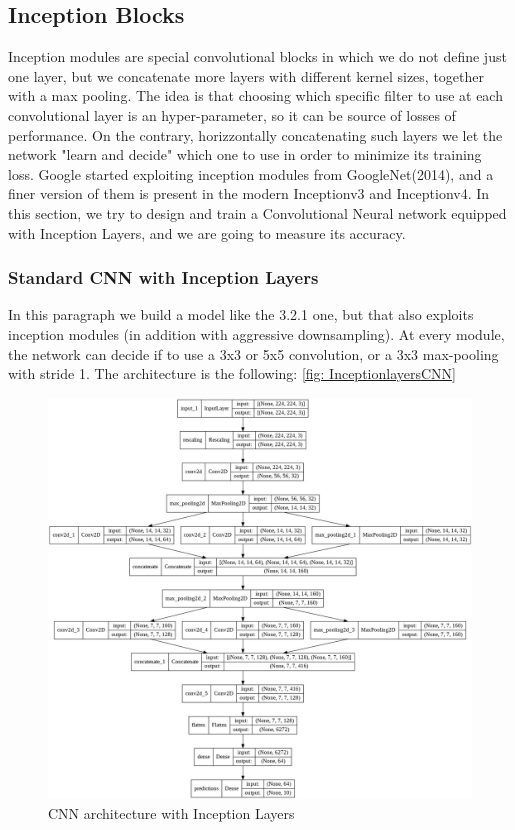 \subsection{Inception Blocks}
Inception modules are special convolutional blocks in which we do not define just one layer, but we concatenate more layers with different kernel sizes, together with a max pooling. The idea is that choosing which specific filter to use at each convolutional layer is an hyper-parameter, so it can be source of losses of performance. On the contrary, horizzontally concatenating such layers we let the network "learn and decide" which one to use in order to minimize its training loss. Google started exploiting inception modules from GoogleNet(2014), and a finer version of them is present in the modern Inceptionv3 and Inceptionv4. In this section, we try to design and train a Convolutional Neural network equipped with Inception Layers, and we are going to measure its accuracy. 

\subsubsection{Standard CNN with Inception Layers}
In this paragraph we build a model like the 3.2.1 one, but that also exploits inception modules (in addition with aggressive downsampling). At every module, the network can decide if to use a 3x3 or 5x5 convolution, or a 3x3 max-pooling with stride 1.
The architecture is the following: \ref{fig: InceptionlayersCNN}


\begin{figure}[H]
	\centering
	\includegraphics[height=0.6\textwidth]{img/scratch/inception_layers.jpg}
	\caption{CNN architecture with Inception Layers}
	\label{fig: InceptionLayersCNN}
\end{figure}

